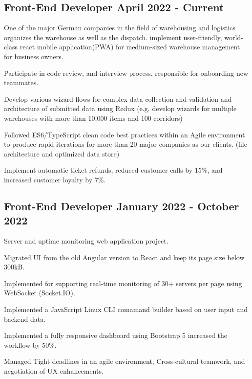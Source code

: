 \subsection{{Front-End Developer \hfill April 2022 - Current}}
\begin{zitemize}
             \item{One of the major German companies in the field of warehousing and logistics organizes the warehouse as well as the dispatch. implement user-friendly, world-class react mobile application(PWA) for medium-sized warehouse management for business owners. 
}
             \item{
                Participate in code review, and interview process, responsible for onboarding new teammates.}
             \item{
                Develop various wizard flows for complex data collection and validation and architecture of submitted data using Redux (e.g. develop wizards for multiple warehouses with more than 10,000 items and 100 corridors)}
             \item{
                Followed ES6/TypeScript clean code best practices within an Agile environment to produce rapid iterations for more than 20 major companies as our clients. (file architecture and optimized data store)}
             \item{
              Implement automatic ticket refunds, reduced customer calls by 15\%, and increased customer loyalty by 7\%.}
\end{zitemize}

\subsection{{Front-End Developer \hfill January 2022 - October 2022}}
\begin{zitemize}
             \item{Server and uptime monitoring web application project.
}
             \item{
                Migrated UI from the old Angular version to React and keep its page size below 300kB.}
             \item{
                Implemented for supporting real-time monitoring of 30+ servers per page using WebSocket (Socket.IO).}
             \item{
               Implemented a JavaScript Linux CLI comamand builder based on user input and backend data.}
             \item{
               Implemented a fully responsive dashboard using Bootstrap 5 increased the workflow by 50\%.}
             \item{
               Managed Tight deadlines in an agile environment, Cross-cultural teamwork, and negotiation of UX enhancements.
}
\end{zitemize}

